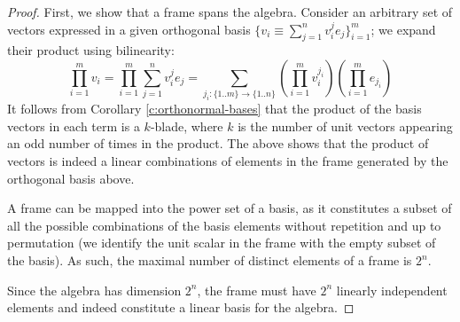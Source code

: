\begin{proof}
	First, we show that a frame spans the algebra. Consider an arbitrary set of vectors expressed in a given orthogonal basis $\{v_i \equiv \sum_{j=1}^n v_i^je_j\}_{i=1}^m$; we expand their product using bilinearity:
	\[\prod_{i=1}^m v_i = \prod_{i=1}^m \sum_{j=1}^n v_i^j e_j = \sum_{j_i : \{1..m\} \to \{1..n\}} \left(\prod_{i=1}^m v_i^{j_i}\right) \left(\prod_{i=1}^m e_{j_i}\right)\]
	It follows from Corollary \ref{c:orthonormal-bases} that the product of the basis vectors in each term is a $k$-blade, where $k$ is the number of unit vectors appearing an odd number of times in the product. The above shows that the product of vectors is indeed a linear combinations of elements in the frame generated by the orthogonal basis above.

	A frame can be mapped into the power set of a basis, as it constitutes a subset of all the possible combinations of the basis elements without repetition and up to permutation (we identify the unit scalar in the frame with the empty subset of the basis). As such, the maximal number of distinct elements of a frame is $2^n$.

	Since the algebra has dimension $2^n$, the frame must have $2^n$ linearly independent elements and indeed constitute a linear basis for the algebra.
\end{proof}
